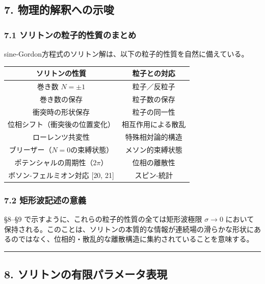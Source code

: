 \documentclass[a4paper,11pt]{ltjsarticle}
\newcounter{none}
\begin{document}
\subsection{7.
物理的解釈への示唆}\label{ux7269ux7406ux7684ux89e3ux91c8ux3078ux306eux793aux5506}

\subsubsection{7.1
ソリトンの粒子的性質のまとめ}\label{ux30bdux30eaux30c8ux30f3ux306eux7c92ux5b50ux7684ux6027ux8ceaux306eux307eux3068ux3081}

sine-Gordon方程式のソリトン解は、以下の粒子的性質を自然に備えている。

{\def\LTcaptype{none} %
\begin{longtable}[]{@{}cc@{}}
\toprule\noalign{}
ソリトンの性質 & 粒子との対応 \\
\midrule\noalign{}
\endhead
\bottomrule\noalign{}
\endlastfoot
巻き数 \(N = \pm 1\) & 粒子／反粒子 \\
巻き数の保存 & 粒子数の保存 \\
衝突時の形状保存 & 粒子の同一性 \\
位相シフト（衝突後の位置変化） & 相互作用による散乱 \\
ローレンツ共変性 & 特殊相対論的構造 \\
ブリーザー（\(N = 0\)の束縛状態） & メソン的束縛状態 \\
ポテンシャルの周期性（\(2\pi\)） & 位相の離散性 \\
ボソン-フェルミオン対応 {[}20, 21{]} & スピン-統計 \\
\end{longtable}
}

\subsubsection{7.2
矩形波記述の意義}\label{ux77e9ux5f62ux6ce2ux8a18ux8ff0ux306eux610fux7fa9}

§8--§9 で示すように、これらの粒子的性質の全ては矩形波極限
\(\sigma \to 0\)
において保持される。このことは、ソリトンの本質的な情報が連続場の滑らかな形状にあるのではなく、位相的・散乱的な離散構造に集約されていることを意味する。

\begin{center}\rule{0.5\linewidth}{0.5pt}\end{center}

\subsection{8.
ソリトンの有限パラメータ表現}\label{ux30bdux30eaux30c8ux30f3ux306eux6709ux9650ux30d1ux30e9ux30e1ux30fcux30bfux8868ux73fe}
\end{document}
